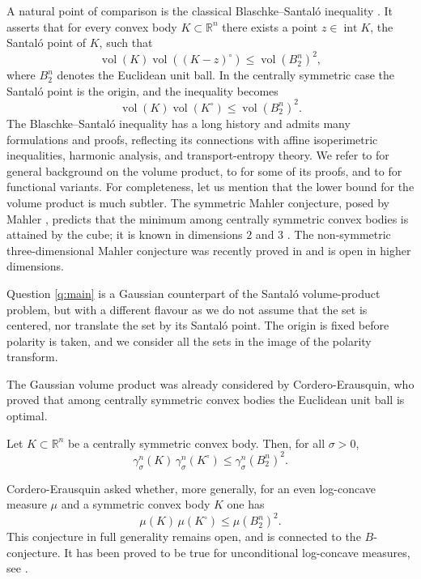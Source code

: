 \documentclass[12pt,oneside,reqno]{amsart}
\numberwithin{equation}{section}
\theoremstyle{remark}
\newenvironment{manualtheorem}[1]{%
  \renewcommand\thetheorem{#1}
  \theorem
}{\endtheorem}
\newcommand{\R}{\mathbb R}
\newcommand{\vol}{\operatorname{vol}}
\begin{document}
A natural point of comparison is the classical Blaschke--Santal\'o inequality \cite{Blaschke, Santalo}. It asserts that for every convex body $K\subset\R^n$ there exists a point $z\in\operatorname{int}K$, the Santal\'o point of $K$, such that
\begin{equation*}
    \vol(K)\vol((K-z)^\circ)\le \vol(B_2^n)^2,
\end{equation*}
 where $B_2^n$ denotes the Euclidean unit ball. In the centrally symmetric case the Santal\'o point is the origin, and the inequality becomes
\[
        \vol(K)\vol(K^\circ)\le \vol(B_2^n)^2.
\]
The Blaschke--Santal\'o inequality has a long history and admits many formulations and proofs, reflecting its connections with affine isoperimetric inequalities, harmonic analysis, and transport-entropy theory. We refer to \cite{Schneider, AAGM,FMZ} for general background on the volume product, to \cite{Blaschke,Santalo,SaintRaymond,Ball-thesis,MeyerPajorBlaschke} for some of its proofs, and to \cite{BallLogConcave,AAKM,FM,BianchiKelly,FathiTalagrand,FGSZ} for functional variants. For completeness, let us mention that the lower bound for the volume product is much subtler. The symmetric Mahler conjecture, posed by Mahler \cite{Mahler1939}, predicts that the minimum among centrally symmetric convex bodies is attained by the cube; it is known in dimensions $2$ and $3$ \cite{Mahler1939,IriyehShibata}. The non-symmetric three-dimensional Mahler conjecture was recently proved in \cite{ChenLiXiXuMahler} and is open in higher dimensions.

Question \ref{q:main} is a Gaussian counterpart of the Santal\'o volume-product problem, but with a different flavour as we do not assume that the set is centered, nor translate the set by its Santal\'o point. The origin is fixed before polarity is taken, and we consider all the sets in the image of the polarity transform.

The Gaussian volume product was already considered by Cordero-Erausquin, who proved that among centrally symmetric convex bodies the Euclidean unit ball is optimal.

\begin{manualtheorem}{A}[Cordero-Erausquin \cite{CorderoSantalo}]\label{thm:symmetric}
Let $K\subset\R^n$ be a centrally symmetric convex body. Then, for all $\sigma>0$,
\[
        \gamma_\sigma^n(K)\,\gamma_\sigma^n(K^\circ)
        \le \gamma_\sigma^n(B_2^n)^2.
\]
\end{manualtheorem}

Cordero-Erausquin asked whether, more generally, for an even log-concave measure $\mu$ and a symmetric convex body $K$ one has
\[
        \mu(K)\,\mu(K^\circ)\le \mu(B_2^n)^2.
\]
This conjecture in full generality remains open, and is connected to the $B$-conjecture. It has been proved to be true for unconditional log-concave measures, see \cite{FMZ,MilmanYehudayoff}. \vspace*{2mm}
\end{document}
